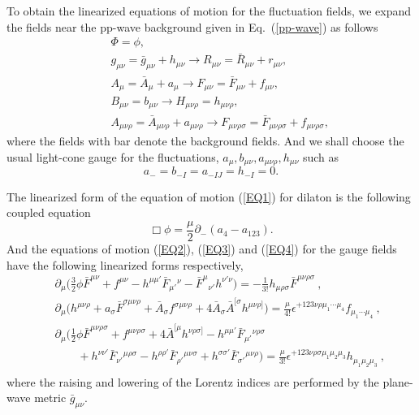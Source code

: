 \documentclass[a4paper,12pt]{article}
\numberwithin{equation}{section}
\begin{document}
To obtain the linearized equations of motion for the fluctuation
fields, we expand the fields near the pp-wave background given
in Eq.~(\ref{pp-wave}) as follows
\begin{eqnarray}
&&\Phi = \phi, \nonumber \\
&&g_{\mu\nu} = \bar g_{\mu\nu} + h_{\mu\nu} \rightarrow R_{\mu\nu}
= \bar R_{\mu\nu}  + r_{\mu\nu},
\nonumber \\
&&A_\mu = \bar A_\mu + a_\mu \rightarrow F_{\mu\nu} = \bar
F_{\mu\nu} + f_{\mu\nu},
\nonumber \\
&& B_{\mu\nu} = b_{\mu\nu} \rightarrow H_{\mu\nu\rho} =
h_{\mu\nu\rho},
\nonumber \\
&& A_{\mu\nu\rho} = \bar A_{\mu\nu\rho} + a_{\mu\nu\rho}
\rightarrow
       F_{\mu\nu\rho\sigma} = \bar F_{\mu\nu\rho\sigma}
                             + f_{\mu\nu\rho\sigma},
\end{eqnarray}
where the fields with bar denote the background fields.  And we
shall choose the usual light-cone gauge for the fluctuations,
$a_\mu, b_{\mu\nu}, a_{\mu\nu\rho}, h_{\mu\nu}$ such as
\begin{equation}\label{gfix}
a_{-} =  b_{-I} =  a_{-IJ} =  h_{-I} = 0.
\end{equation}

The linearized form of the equation of motion (\ref{EQ1}) for
dilaton is the following coupled equation
\begin{equation} \label{LEQ1}
\Box \phi = \frac{\mu}2 \partial_- ( a_4 - a_{123}).
\end{equation}
And the equations of motion (\ref{EQ2}), (\ref{EQ3}) and (\ref{EQ4})
for the gauge fields have the following linearized forms respectively,
\begin{eqnarray}
&& \partial_\mu
   \bigg(  \frac32 \phi \bar{F}^{\mu\nu}
         + f^{\mu\nu} - h^{\mu\mu'} \bar{F}_{\mu'}{}^\nu
         - \bar{F}^\mu{}_{\nu'} h^{\nu'\nu}
   \bigg) =
  -\frac1{3!} h_{\mu\rho\sigma} \bar{F}^{\mu\nu\rho\sigma} ~,
\label{LEQ2} \\
&& \partial_\mu
   \bigg( h^{\mu\nu\rho}
        + a_\sigma\bar F^{\sigma\mu\nu\rho}
        + \bar{A}_\sigma f^{\sigma\mu\nu\rho}
        + 4 \bar{A}_\sigma \bar{A}^{[\sigma} h^{\mu\nu\rho]}
   \bigg) =
  \frac{\mu}{4!}
  \epsilon^{+123\nu\rho\mu_1\cdots \mu_4} f_{\mu_1\cdots \mu_4} ~,
\label{LEQ3} \\
&& \partial_\mu
   \bigg( \frac12 \phi \bar{F}^{\mu\nu\rho\sigma}
         + f^{\mu\nu\rho\sigma}
         + 4 \bar{A}^{[\mu} h^{\nu\rho\sigma]}
         - h^{\mu\mu'} \bar{F}_{\mu'}{}^{\nu\rho\sigma}
\nonumber \\
&&  \qquad
         + h^{\nu\nu'} \bar{F}_{\nu'}{}^{\mu\rho\sigma}
         - h^{\rho\rho'} \bar{F}_{\rho'}{}^{\mu\nu\sigma}
         + h^{\sigma\sigma'} \bar{F}_{\sigma'}{}^{\mu\nu\rho}
    \bigg) =
        \frac{\mu}{3!}
        \epsilon^{+123\nu\rho\sigma\mu_1\mu_2\mu_3}
        h_{\mu_1\mu_2\mu_3} ~,
\nonumber
\\ \label{LEQ4}
\end{eqnarray}
where the raising and lowering of the Lorentz indices are
performed by the plane-wave metric $\bar g_{\mu\nu}$.
\end{document}
